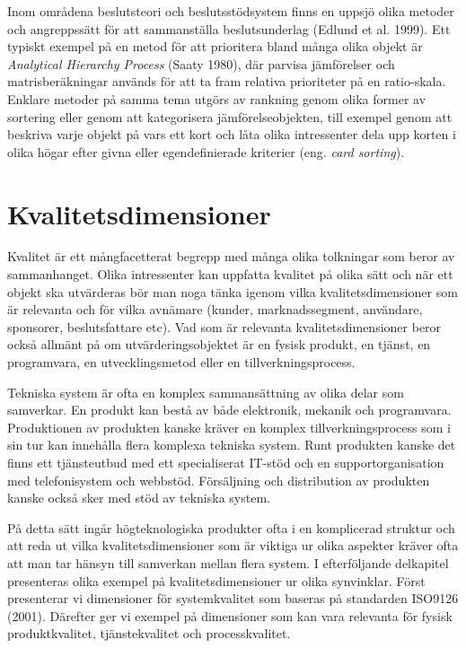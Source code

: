 Inom områdena beslutsteori och beslutsstödsystem finns en uppsjö olika
metoder och angreppssätt för att sammanställa beslutsunderlag (Edlund et
al. 1999). Ett typiskt exempel på en metod för att prioritera bland
många olika objekt är \emph{Analytical Hierarchy Process} (Saaty 1980),
där parvisa jämförelser och matrisberäkningar används för att ta fram
relativa prioriteter på en ratio-skala. Enklare metoder på samma tema
utgörs av rankning genom olika former av sortering eller genom att
kategorisera jämförelseobjekten, till exempel genom att beskriva varje
objekt på vars ett kort och låta olika intressenter dela upp korten i
olika högar efter givna eller egendefinierade kriterier (eng. \emph{card
sorting}).

\section{Kvalitetsdimensioner }\label{kvalitetsdimensioner}

Kvalitet är ett mångfacetterat begrepp med många olika tolkningar som
beror av sammanhanget. Olika intressenter kan uppfatta kvalitet på olika
sätt och när ett objekt ska utvärderas bör man noga tänka igenom vilka
kvalitetsdimensioner som är relevanta och för vilka avnämare (kunder,
marknadssegment, användare, sponsorer, beslutsfattare etc). Vad som är
relevanta kvalitetsdimensioner beror också allmänt på om
utvärderingsobjektet är en fysisk produkt, en tjänst, en programvara, en
utvecklingsmetod eller en tillverkningsprocess.

Tekniska system är ofta en komplex sammansättning av olika delar som
samverkar. En produkt kan bestå av både elektronik, mekanik och
programvara. Produktionen av produkten kanske kräver en komplex
tillverkningsprocess som i sin tur kan innehålla flera komplexa tekniska
system. Runt produkten kanske det finns ett tjänsteutbud med ett
specialiserat IT-stöd och en supportorganisation med telefonisystem och
webbstöd. Försäljning och distribution av produkten kanske också sker
med stöd av tekniska system.

På detta sätt ingår högteknologiska produkter ofta i en komplicerad
struktur och att reda ut vilka kvalitetsdimensioner som är viktiga ur
olika aspekter kräver ofta att man tar hänsyn till samverkan mellan
flera system. I efterföljande delkapitel presenteras olika exempel på
kvalitetsdimensioner ur olika synvinklar. Först presenterar vi
dimensioner för systemkvalitet som baseras på standarden ISO9126 (2001).
Därefter ger vi exempel på dimensioner som kan vara relevanta för fysisk
produktkvalitet, tjänstekvalitet och processkvalitet.

